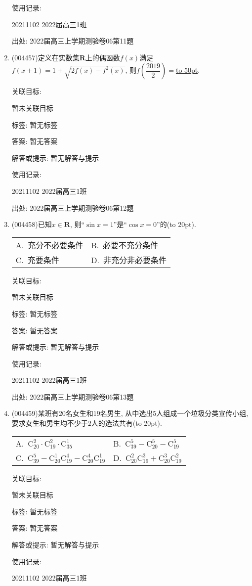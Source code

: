 \documentclass[10pt,a4paper]{article}
\newcommand{\blank}[1]{\underline{\hbox to #1pt{}}}
\newcommand{\bracket}[1]{(\hbox to #1pt{})}
\newcommand{\twoch}[4]{\par\begin{tabular}{p{.46\textwidth}p{.46\textwidth}}
A.~#1& B.~#2\\
C.~#3& D.~#4
\end{tabular}}
\begin{document}
\begin{enumerate}[1.]
使用记录:

20211102	2022届高三1班	


出处: 2022届高三上学期测验卷06第11题
\item { (004457)}定义在实数集$\mathbf{R}$上的偶函数$f(x)$满足$f(x+1)=1+\sqrt{2f(x)-f^2(x)}$, 则$f(\dfrac{2019}{2})=$\blank{50}.


关联目标:

暂未关联目标



标签: 暂无标签

答案: 暂无答案

解答或提示: 暂无解答与提示

使用记录:

20211102	2022届高三1班	


出处: 2022届高三上学期测验卷06第12题
\item { (004458)}已知$x\in \mathbf{R}$, 则``$\sin x=1$''是``$\cos x=0$''的\bracket{20}.
\twoch{充分不必要条件}{必要不充分条件}{充要条件}{非充分非必要条件}


关联目标:

暂未关联目标



标签: 暂无标签

答案: 暂无答案

解答或提示: 暂无解答与提示

使用记录:

20211102	2022届高三1班	


出处: 2022届高三上学期测验卷06第13题
\item { (004459)}某班有$20$名女生和$19$名男生, 从中选出$5$人组成一个垃圾分类宣传小组, 要求女生和男生均不少于$2$人的选法共有\bracket{20}.
\twoch{$\mathrm{C}_{20}^2\cdot \mathrm{C}_{19}^2\cdot \mathrm{C}_{35}^1$}{$\mathrm{C}_{39}^5-\mathrm{C}_{20}^5-\mathrm{C}_{19}^5$}{$\mathrm{C}_{39}^5-\mathrm{C}_{20}^1\mathrm{C}_{19}^4-\mathrm{C}_{20}^4\mathrm{C}_{19}^{1}$}{$\mathrm{C}_{20}^2\mathrm{C}_{19}^3+\mathrm{C}_{20}^3\mathrm{C}_{19}^2$}


关联目标:

暂未关联目标



标签: 暂无标签

答案: 暂无答案

解答或提示: 暂无解答与提示

使用记录:

20211102	2022届高三1班	



\end{enumerate}
\end{document}
